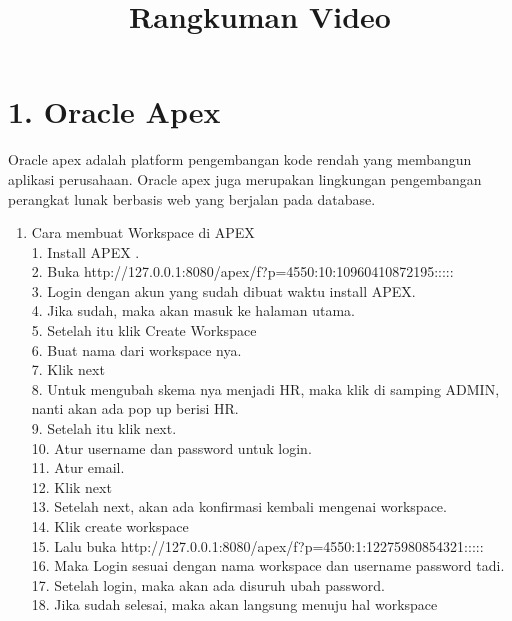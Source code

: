 \clearpage
\setcounter{page}{1}

\begin{center}
\title{\LARGE \bf Rangkuman Video}
\end{center}

\section*{\normalsize 1. Oracle Apex} 
\hspace {\parindent}Oracle apex adalah platform pengembangan kode rendah yang membangun aplikasi perusahaan. Oracle apex juga merupakan lingkungan pengembangan perangkat lunak berbasis web yang berjalan pada database.
\begin{enumerate}[label=\alph*.]
\item Cara membuat Workspace di APEX\\
1. Install APEX .\\
2. Buka http://127.0.0.1:8080/apex/f?p=4550:10:10960410872195:::::\\
3. Login dengan akun yang sudah dibuat waktu install APEX.\\
4. Jika sudah, maka akan masuk ke halaman utama.\\
5. Setelah itu klik Create Workspace\\
6. Buat nama dari workspace nya.\\
7. Klik next\\
8. Untuk mengubah skema nya menjadi HR, maka klik di samping ADMIN, nanti akan ada pop up berisi HR.\\
9. Setelah itu klik next.\\
10. Atur username dan password untuk login.\\
11. Atur email.\\
12. Klik next\\
13. Setelah next, akan ada konﬁrmasi kembali mengenai workspace.\\
14. Klik create workspace\\
15. Lalu buka http://127.0.0.1:8080/apex/f?p=4550:1:12275980854321:::::\\
16. Maka Login sesuai dengan nama workspace dan username password tadi.\\
17. Setelah login, maka akan ada disuruh ubah password.\\
18. Jika sudah selesai, maka akan langsung menuju hal workspace\\
\end{enumerate}

